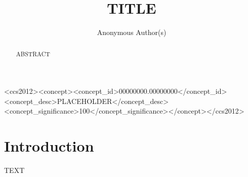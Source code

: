 \documentclass[sigconf,anonymous,review]{acmart}
\begin{document}
\title{TITLE}
\author{Anonymous Author(s)}
\begin{abstract}
ABSTRACT
\end{abstract}
\begin{CCSXML}
<ccs2012><concept><concept_id>00000000.00000000</concept_id><concept_desc>PLACEHOLDER</concept_desc><concept_significance>100</concept_significance></concept></ccs2012>
\end{CCSXML}
\maketitle

\section{Introduction}
TEXT



\end{document}
